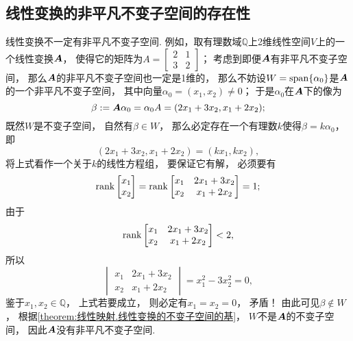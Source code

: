 \subsection{线性变换的非平凡不变子空间的存在性}
线性变换不一定有非平凡不变子空间.
例如，取有理数域\(\mathbb{Q}\)上2维线性空间\(V\)上的一个线性变换\(\boldsymbol{A}\)，
使得它的矩阵为\(A = \begin{bmatrix}
	2 & 1 \\
	3 & 2
\end{bmatrix}\)；
考虑到即便\(\boldsymbol{A}\)有非平凡不变子空间，
那么\(\boldsymbol{A}\)的非平凡不变子空间也一定是1维的，
那么不妨设\(W = \operatorname{span}\{\alpha_0\}\)是\(\boldsymbol{A}\)的一个非平凡不变子空间，
其中向量\(\alpha_0=(x_1,x_2)\neq0\)；
于是\(\alpha_0\)在\(\boldsymbol{A}\)下的像为\begin{equation*}
	\beta
	:= \boldsymbol{A} \alpha_0
	= \alpha_0 A
	= (2x_1+3x_2,x_1+2x_2);
\end{equation*}
既然\(W\)是不变子空间，
自然有\(\beta \in W\)，
那么必定存在一个有理数\(k\)使得\(\beta = k \alpha_0\)，
即\begin{equation*}
	(2x_1+3x_2,x_1+2x_2)=(k x_1,k x_2),
\end{equation*}
将上式看作一个关于\(k\)的线性方程组，
要保证它有解，
必须要有\begin{equation*}
	\rank\begin{bmatrix}
		x_1 \\ x_2
	\end{bmatrix}
	= \rank\begin{bmatrix}
		x_1 & 2x_1+3x_2 \\
		x_2 & x_1+2x_2
	\end{bmatrix}
	= 1;
\end{equation*}
由于\begin{equation*}
	\rank\begin{bmatrix}
		x_1 & 2x_1+3x_2 \\
		x_2 & x_1+2x_2
	\end{bmatrix}
	< 2,
\end{equation*}
所以\begin{equation*}
	\begin{vmatrix}
		x_1 & 2x_1+3x_2 \\
		x_2 & x_1+2x_2
	\end{vmatrix}
	= x_1^2 - 3x_2^2
	= 0,
\end{equation*}
鉴于\(x_1,x_2 \in \mathbb{Q}\)，
上式若要成立，
则必定有\(x_1 = x_2 = 0\)，
矛盾！
由此可见\(\beta \notin W\)，
根据\cref{theorem:线性映射.线性变换的不变子空间的基}，
\(W\)不是\(\boldsymbol{A}\)的不变子空间，
因此\(\boldsymbol{A}\)没有非平凡不变子空间.

